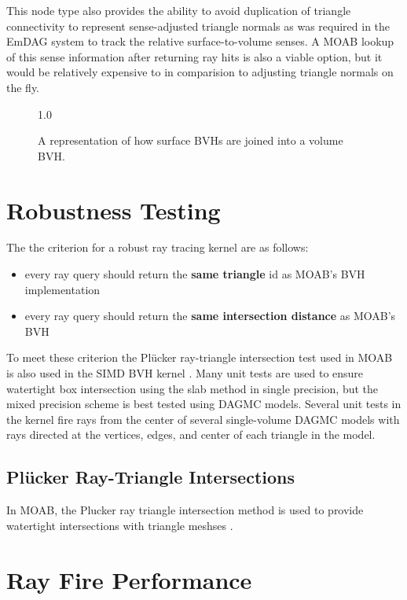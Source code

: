 This node type also provides the ability to avoid duplication of triangle
connectivity to represent sense-adjusted triangle normals as was required in the
EmDAG system to track the relative surface-to-volume senses. A MOAB lookup of
this sense information after returning ray hits is also a viable option, but it
would be relatively expensive to in comparision to adjusting triangle normals on
the fly.

\begin{figure}[H]
  \centering
  {1.0\textwidth}
  \caption{A representation of how surface BVHs are joined into a volume BVH.}
  \label{fig:quad_tree_sets}
\end{figure}

\section{Robustness Testing}

The the criterion for a robust ray tracing kernel are as follows:

\begin{itemize}
  \item every ray query should return the \textbf{same triangle} id as MOAB's BVH
    implementation
  \item every ray query should return the \textbf{same intersection distance} as MOAB's BVH
\end{itemize}

To meet these criterion the Pl\"{u}cker ray-triangle intersection test used in
MOAB is also used in the SIMD BVH kernel \cite{Platis_2003}. Many unit tests are
used to ensure watertight box intersection using the slab method \cite{Kay_1986}
in  single precision, but the mixed precision scheme is
best tested using DAGMC models. Several unit tests in the kernel fire rays from the
center of several single-volume DAGMC models with rays directed at the
vertices, edges, and center of each triangle in the model.



\subsection{Pl\"{u}cker Ray-Triangle Intersections}\label{sec:intersection_distances}

In MOAB, the Plucker ray triangle intersection method is used to provide
watertight intersections with triangle meshses \cite{Platis_2003}.


\section{Ray Fire Performance}



